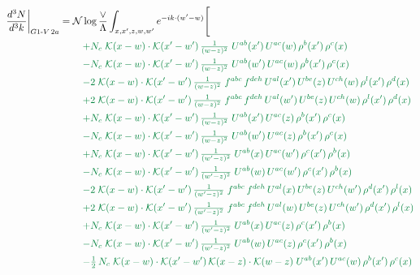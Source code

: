 \documentclass[10pt]{article}
\numberwithin{equation}{section}
\newcommand{\NN}{\mathcal N\log\frac{\vee}{\Lambda}}
\begin{document}
\begin{align}
\frac{d^3N}{d^3k}\bigg|_{G1\text{-}V\,2a}={}&\NN\int_{x,x',z,w,w'}e^{-ik\cdot(w'-w)}\Bigg[\notag\\
&\quad{\color{JIM}+N_c\;\mathcal{K}(x-w)\cdot\mathcal{K}(x'-w')\,\tfrac{1}{(w-z)^{2}}\;U^{ab}(x')\,U^{ac}(w)\,\rho^{b}(x')\,\rho^{c}(x)}\notag\\
&\quad{\color{JIM}-N_c\;\mathcal{K}(x-w)\cdot\mathcal{K}(x'-w')\,\tfrac{1}{(w-z)^{2}}\;U^{ab}(w')\,U^{ac}(w)\,\rho^{b}(x')\,\rho^{c}(x)}\notag\\
&\quad{\color{JIM}-2\;\mathcal{K}(x-w)\cdot\mathcal{K}(x'-w')\,\tfrac{1}{(w-z)^{2}}\;f^{abc}\,f^{deh}\,U^{al}(x')\,U^{be}(z)\,U^{ch}(w)\,\rho^{l}(x')\,\rho^{d}(x)}\notag\\
&\quad{\color{JIM}+2\;\mathcal{K}(x-w)\cdot\mathcal{K}(x'-w')\,\tfrac{1}{(w-z)^{2}}\;f^{abc}\,f^{deh}\,U^{al}(w')\,U^{be}(z)\,U^{ch}(w)\,\rho^{l}(x')\,\rho^{d}(x)}\notag\\
&\quad{\color{JIM}+N_c\;\mathcal{K}(x-w)\cdot\mathcal{K}(x'-w')\,\tfrac{1}{(w-z)^{2}}\;U^{ab}(x')\,U^{ac}(z)\,\rho^{b}(x')\,\rho^{c}(x)}\notag\\
&\quad{\color{JIM}-N_c\;\mathcal{K}(x-w)\cdot\mathcal{K}(x'-w')\,\tfrac{1}{(w-z)^{2}}\;U^{ab}(w')\,U^{ac}(z)\,\rho^{b}(x')\,\rho^{c}(x)}\notag\\
&\quad{\color{JIM}+N_c\;\mathcal{K}(x-w)\cdot\mathcal{K}(x'-w')\,\tfrac{1}{(w'-z)^{2}}\;U^{ab}(x)\,U^{ac}(w')\,\rho^{c}(x')\,\rho^{b}(x)}\notag\\
&\quad{\color{JIM}-N_c\;\mathcal{K}(x-w)\cdot\mathcal{K}(x'-w')\,\tfrac{1}{(w'-z)^{2}}\;U^{ab}(w)\,U^{ac}(w')\,\rho^{c}(x')\,\rho^{b}(x)}\notag\\
&\quad{\color{JIM}-2\;\mathcal{K}(x-w)\cdot\mathcal{K}(x'-w')\,\tfrac{1}{(w'-z)^{2}}\;f^{abc}\,f^{deh}\,U^{al}(x)\,U^{be}(z)\,U^{ch}(w')\,\rho^{d}(x')\,\rho^{l}(x)}\notag\\
&\quad{\color{JIM}+2\;\mathcal{K}(x-w)\cdot\mathcal{K}(x'-w')\,\tfrac{1}{(w'-z)^{2}}\;f^{abc}\,f^{deh}\,U^{al}(w)\,U^{be}(z)\,U^{ch}(w')\,\rho^{d}(x')\,\rho^{l}(x)}\notag\\
&\quad{\color{JIM}+N_c\;\mathcal{K}(x-w)\cdot\mathcal{K}(x'-w')\,\tfrac{1}{(w'-z)^{2}}\;U^{ab}(x)\,U^{ac}(z)\,\rho^{c}(x')\,\rho^{b}(x)}\notag\\
&\quad{\color{JIM}-N_c\;\mathcal{K}(x-w)\cdot\mathcal{K}(x'-w')\,\tfrac{1}{(w'-z)^{2}}\;U^{ab}(w)\,U^{ac}(z)\,\rho^{c}(x')\,\rho^{b}(x)}\notag\\
&\quad{\color{JIM}-\tfrac{1}{2}\,N_c\;\mathcal{K}(x-w)\cdot\mathcal{K}(x'-w')\,\mathcal{K}(x-z)\cdot\mathcal{K}(w-z)\;U^{ab}(x')\,U^{ac}(w)\,\rho^{b}(x')\,\rho^{c}(x)}\notag\\

\end{align}
\end{document}
